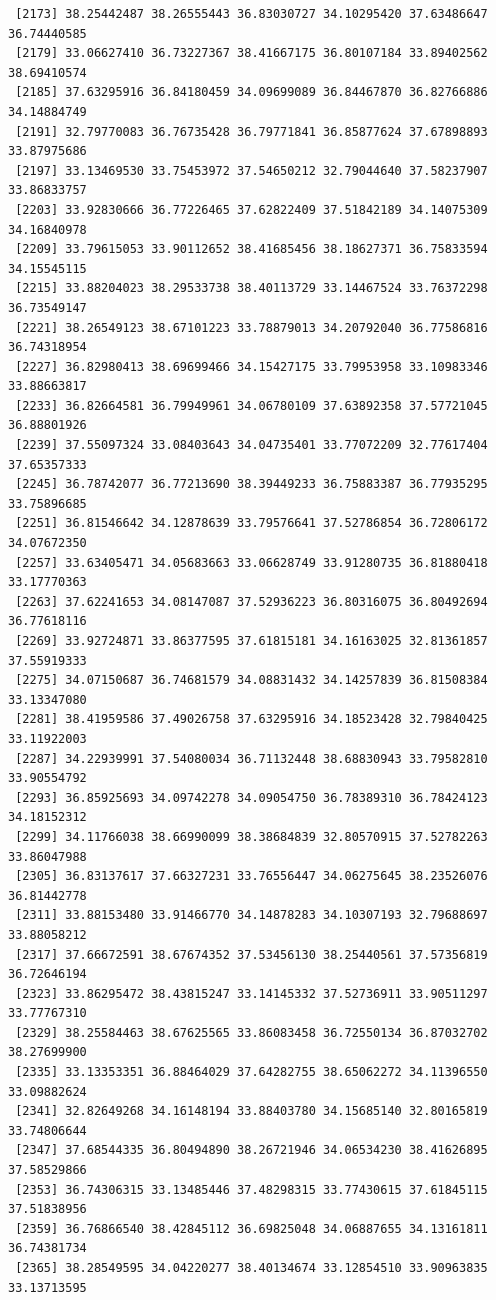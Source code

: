 \documentclass[
  letterpaper,
  DIV=11,
  numbers=noendperiod]{scrartcl}
\begin{document}
\begin{verbatim}
 [2173] 38.25442487 38.26555443 36.83030727 34.10295420 37.63486647 36.74440585
 [2179] 33.06627410 36.73227367 38.41667175 36.80107184 33.89402562 38.69410574
 [2185] 37.63295916 36.84180459 34.09699089 36.84467870 36.82766886 34.14884749
 [2191] 32.79770083 36.76735428 36.79771841 36.85877624 37.67898893 33.87975686
 [2197] 33.13469530 33.75453972 37.54650212 32.79044640 37.58237907 33.86833757
 [2203] 33.92830666 36.77226465 37.62822409 37.51842189 34.14075309 34.16840978
 [2209] 33.79615053 33.90112652 38.41685456 38.18627371 36.75833594 34.15545115
 [2215] 33.88204023 38.29533738 38.40113729 33.14467524 33.76372298 36.73549147
 [2221] 38.26549123 38.67101223 33.78879013 34.20792040 36.77586816 36.74318954
 [2227] 36.82980413 38.69699466 34.15427175 33.79953958 33.10983346 33.88663817
 [2233] 36.82664581 36.79949961 34.06780109 37.63892358 37.57721045 36.88801926
 [2239] 37.55097324 33.08403643 34.04735401 33.77072209 32.77617404 37.65357333
 [2245] 36.78742077 36.77213690 38.39449233 36.75883387 36.77935295 33.75896685
 [2251] 36.81546642 34.12878639 33.79576641 37.52786854 36.72806172 34.07672350
 [2257] 33.63405471 34.05683663 33.06628749 33.91280735 36.81880418 33.17770363
 [2263] 37.62241653 34.08147087 37.52936223 36.80316075 36.80492694 36.77618116
 [2269] 33.92724871 33.86377595 37.61815181 34.16163025 32.81361857 37.55919333
 [2275] 34.07150687 36.74681579 34.08831432 34.14257839 36.81508384 33.13347080
 [2281] 38.41959586 37.49026758 37.63295916 34.18523428 32.79840425 33.11922003
 [2287] 34.22939991 37.54080034 36.71132448 38.68830943 33.79582810 33.90554792
 [2293] 36.85925693 34.09742278 34.09054750 36.78389310 36.78424123 34.18152312
 [2299] 34.11766038 38.66990099 38.38684839 32.80570915 37.52782263 33.86047988
 [2305] 36.83137617 37.66327231 33.76556447 34.06275645 38.23526076 36.81442778
 [2311] 33.88153480 33.91466770 34.14878283 34.10307193 32.79688697 33.88058212
 [2317] 37.66672591 38.67674352 37.53456130 38.25440561 37.57356819 36.72646194
 [2323] 33.86295472 38.43815247 33.14145332 37.52736911 33.90511297 33.77767310
 [2329] 38.25584463 38.67625565 33.86083458 36.72550134 36.87032702 38.27699900
 [2335] 33.13353351 36.88464029 37.64282755 38.65062272 34.11396550 33.09882624
 [2341] 32.82649268 34.16148194 33.88403780 34.15685140 32.80165819 33.74806644
 [2347] 37.68544335 36.80494890 38.26721946 34.06534230 38.41626895 37.58529866
 [2353] 36.74306315 33.13485446 37.48298315 33.77430615 37.61845115 37.51838956
 [2359] 36.76866540 38.42845112 36.69825048 34.06887655 34.13161811 36.74381734
 [2365] 38.28549595 34.04220277 38.40134674 33.12854510 33.90963835 33.13713595

\end{verbatim}
\end{document}
